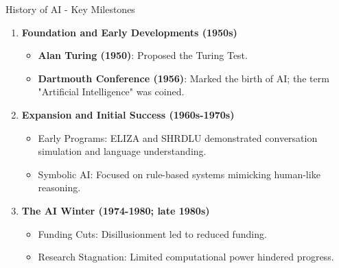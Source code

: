 \documentclass[aspectratio=169]{beamer}
\begin{document}
\begin{frame}[fragile]{History of AI - Key Milestones}
    \begin{enumerate}
        \item \textbf{Foundation and Early Developments (1950s)}
            \begin{itemize}
                \item \textbf{Alan Turing (1950)}: Proposed the Turing Test.
                \item \textbf{Dartmouth Conference (1956)}: Marked the birth of AI; the term "Artificial Intelligence" was coined.
            \end{itemize}
        
        \item \textbf{Expansion and Initial Success (1960s-1970s)}
            \begin{itemize}
                \item Early Programs: ELIZA and SHRDLU demonstrated conversation simulation and language understanding.
                \item Symbolic AI: Focused on rule-based systems mimicking human-like reasoning.
            \end{itemize}
        
        \item \textbf{The AI Winter (1974-1980; late 1980s)}
            \begin{itemize}
                \item Funding Cuts: Disillusionment led to reduced funding.
                \item Research Stagnation: Limited computational power hindered progress.
            \end{itemize}
    \end{enumerate}
\end{frame}
\end{document}
